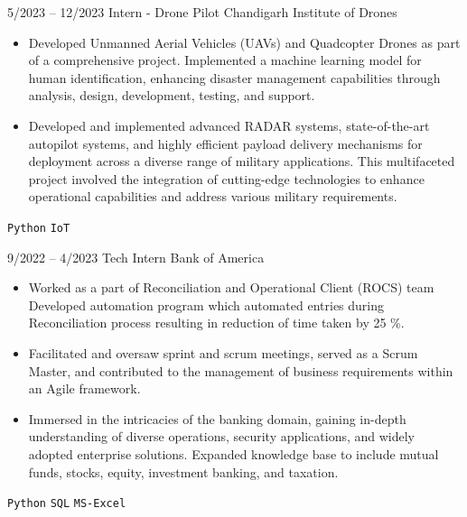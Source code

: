 \documentclass[9pt]{developercv} %
\begin{document}
\vspace{-10 pt}
\begin{entrylist}
	\entry
        {5/2023 -- 12/2023}
		{Intern - Drone Pilot}
		{Chandigarh Institute of Drones}
		{\vspace{-10pt}
        \begin{itemize}[noitemsep,topsep=0pt,parsep=0pt,partopsep=0pt, leftmargin=-1pt]
            \item Developed Unmanned Aerial Vehicles (UAVs) and Quadcopter Drones as part of a comprehensive project. Implemented a machine learning model for human identification, enhancing disaster management capabilities through analysis, design, development, testing, and support.
            \item Developed and implemented advanced RADAR systems, state-of-the-art autopilot systems, and highly efficient payload delivery mechanisms for deployment across a diverse range of military applications. This multifaceted project involved the integration of cutting-edge technologies to enhance operational capabilities and address various military requirements.
        \end{itemize} 
        \texttt{Python} \slashsep \texttt{IoT}}
	\entry
		{9/2022 -- 4/2023}
		{Tech Intern}
		{Bank of America}
		{\vspace{-10pt}
        \begin{itemize}[noitemsep,topsep=0pt,parsep=0pt,partopsep=0pt, leftmargin=-1pt]
            \item Worked as a part of Reconciliation and Operational Client (ROCS) team Developed automation program which automated entries during Reconciliation process resulting in reduction of time taken by 25 \%.
            \item Facilitated and oversaw sprint and scrum meetings, served as a Scrum Master, and contributed to the management of business requirements within an Agile framework.
            \item Immersed in the intricacies of the banking domain, gaining in-depth understanding of diverse operations, security applications, and widely adopted enterprise solutions. Expanded knowledge base to include mutual funds, stocks, equity, investment banking, and taxation.
        \end{itemize} 
        \texttt{Python} \slashsep \texttt{SQL} \slashsep \texttt{MS-Excel}}

\end{entrylist}
\end{document}
